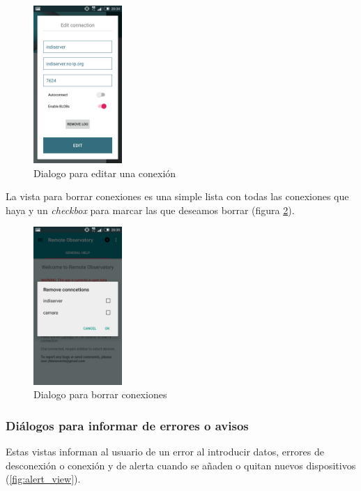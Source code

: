 \begin{figure}[!ht]
  \begin{center}
  \includegraphics[width=0.3\textwidth]{../images/editar_conexion.png}
  \caption{Dialogo para editar una conexión}
  \label{fig:edit_connect}
  \end{center}
\end{figure}

\bigskip
La vista para borrar conexiones es una simple lista con todas las conexiones que haya y un \textit{checkbox} para marcar las que deseamos borrar (figura \ref{fig:remove_connect}).


\begin{figure}[!ht]
  \begin{center}
  \includegraphics[width=0.3\textwidth]{../images/borrar_conexiones.png}
  \caption{Dialogo para borrar conexiones}
  \label{fig:remove_connect}
  \end{center}
\end{figure}


\bigskip
\subsubsection{Diálogos para informar de errores o avisos}
Estas vistas informan al usuario de un error al introducir datos, errores de desconexión o conexión y de alerta cuando se añaden o quitan nuevos dispositivos (\ref{fig:alert_view}).

